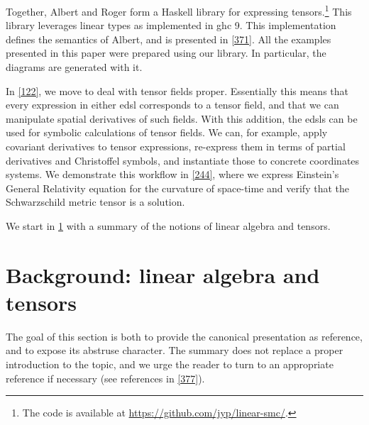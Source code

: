 \documentclass[nolinenum]{jfp}
\begin{document}
Together, {\sc{}Albert} and {\sc{}Roger} form a Haskell library for expressing
tensors.\footnote{The code is available at \url{https://github.com/jyp/linear-smc/}.}  This library
leverages linear types as implemented in {\sc{}ghc} 9.  This
implementation defines the semantics of {\sc{}Albert}, and is presented in
\cref{371}. All the examples presented in this paper were prepared using our library. In particular, the diagrams are
generated with it.

In \cref{122}, we move to deal with tensor fields
proper. Essentially this means that every expression in either {\sc{}edsl} corresponds to a tensor field, and that we can manipulate spatial
derivatives of such fields. With this addition, the {\sc{}edsl}s can be used
for symbolic calculations of tensor fields. We can, for example, apply
covariant derivatives to tensor expressions, re-express them in terms
of partial derivatives and Christoffel symbols, and instantiate those to
concrete coordinates systems. We demonstrate this workflow in
\cref{244}, where we express Einstein's General Relativity equation for
the curvature of space-time and verify that the Schwarzschild metric
tensor is a solution.

We start in \cref{18} with a summary of the notions of linear algebra and tensors.

\section{Background: linear algebra and tensors}\label{18} 
The goal of this section is both to provide the canonical
presentation as reference, and to expose its abstruse character. The
summary does not replace a proper introduction to the topic, and we
urge the reader to turn to an appropriate reference if necessary (see references in \cref{377}).
\end{document}
